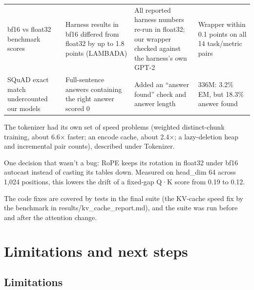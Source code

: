 \documentclass[11pt]{article}
\begin{document}
\begin{center}
\begin{tabularx}{\linewidth}{>{\raggedright\arraybackslash}X>{\raggedright\arraybackslash}X>{\raggedright\arraybackslash}X>{\raggedright\arraybackslash}X}
bf16 vs float32 benchmark scores & Harness results in bf16 differed from float32 by up to 1.8 points (LAMBADA) & All reported harness numbers re-run in float32; our wrapper checked against the harness's own GPT-2 & Wrapper within 0.1 points on all 14 task/\allowbreak{}metric pairs \\
SQuAD exact match undercounted our models & Full-sentence answers containing the right answer scored 0 & Added an ``answer found'' check and answer length & 336M: 3.2\% EM, but 18.3\% answer found \\
\bottomrule
\end{tabularx}
\end{center}

The tokenizer had its own set of speed problems (weighted distinct-chunk training, about 6.6× faster; an encode cache, about 2.4×; a lazy-deletion heap and incremental pair counts), described under Tokenizer.

One decision that wasn't a bug: RoPE keeps its rotation in float32 under bf16 autocast instead of casting its tables down. Measured on head\_\allowbreak{}dim 64 across 1,024 positions, this lowers the drift of a fixed-gap Q·K score from 0.19 to 0.12.

The code fixes are covered by tests in the final suite (the KV-cache speed fix by the benchmark in results/\allowbreak{}kv\_\allowbreak{}cache\_\allowbreak{}report.md), and the suite was run before and after the attention change.

\section{Limitations and next steps}

\subsection{Limitations}
\end{document}
